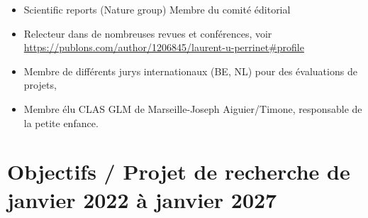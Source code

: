 \documentclass[10pt,french,a4paper,oneside]{article}%
\begin{document}
\begin{itemize}

	\item Scientific reports (Nature group) Membre du comité éditorial

	\item  Relecteur dans de nombreuses revues et conférences, voir \url{https://publons.com/author/1206845/laurent-u-perrinet#profile}

	\item  Membre de différents jurys internationaux (BE, NL) pour des évaluations de projets,

	\item Membre élu CLAS GLM de Marseille-Joseph Aiguier/Timone, responsable de la petite enfance.

\end{itemize}

\newpage
\section{Objectifs / Projet de recherche de janvier 2022 à janvier 2027}



\newpage
\printbibliography
\end{document}
